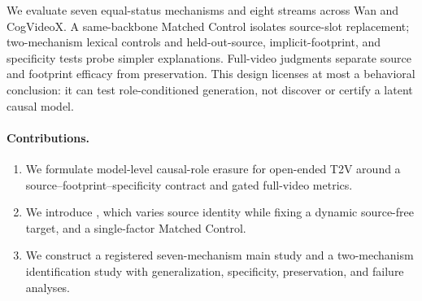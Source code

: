 

\begin{samepage}
We evaluate seven equal-status mechanisms and eight streams across Wan and
CogVideoX.  A same-backbone Matched Control isolates source-slot replacement;
two-mechanism lexical controls and held-out-source, implicit-footprint, and
specificity tests probe simpler explanations.  Full-video judgments separate
source and footprint efficacy from preservation.  This design licenses at
most a behavioral conclusion: it can test role-conditioned generation, not
discover or certify a latent causal model.\par
\end{samepage}


\paragraph{Contributions.}
\begin{enumerate}
  \item We formulate model-level causal-role erasure for open-ended T2V around
        a source--footprint--specificity contract and gated full-video metrics.
  \item We introduce \methodname, which varies source identity while fixing a
        dynamic source-free target, and a single-factor Matched Control.
  \item We construct a registered seven-mechanism main study and a
        two-mechanism identification study with generalization, specificity,
        preservation, and failure analyses.
\end{enumerate}

